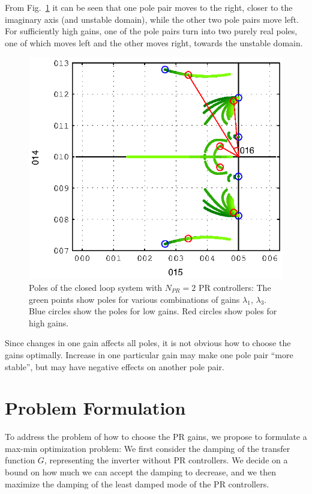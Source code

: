 \documentclass[conference,10pt]{IEEEtran}
\begin{document}
From Fig.~\ref{fig:PoleExample} it can be seen that one pole pair moves to the right, closer to the imaginary axis (and unstable domain), while the other two pole pairs move left. For sufficiently high gains, one of the pole pairs turn into two purely real poles, one of which moves left and the other moves right, towards the unstable domain.
\begin{figure}[!h]
\centering

\includegraphics{fig/root_locus_2D}
\caption{Poles of the closed loop system with $N_{PR}=2$ PR controllers: The green points show poles for various combinations of gains $\lambda_1$,
$\lambda_3$. Blue circles show the poles for low gains. Red circles show poles for high gains. }
\label{fig:PoleExample}
\end{figure}

Since changes in one gain affects all poles, it is not obvious how to choose the gains optimally. Increase in one particular gain may make one pole pair ``more stable'', but may have negative effects on another pole pair.




\section{Problem Formulation}
\label{sec:probform}
To address the problem of how to choose the PR gains, we propose to formulate a max-min optimization problem: We first consider the damping of the transfer function $G$, representing the inverter without PR controllers. We decide on a bound on how much we can accept the damping to decrease, and we then maximize the damping of the least damped 
mode of the PR controllers.
\end{document}
